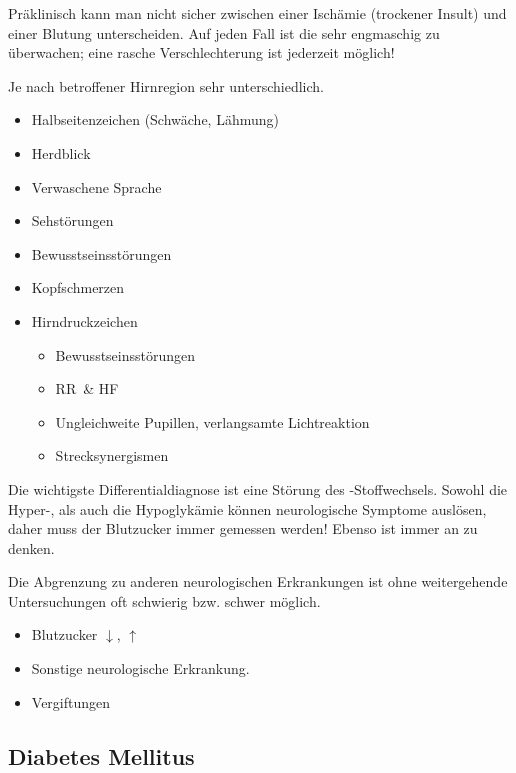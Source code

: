 {{\begin{itemize}
\end{itemize}

Präklinisch kann man nicht sicher zwischen einer Ischämie
(trockener Insult) und einer Blutung unterscheiden.
Auf jeden Fall ist die  sehr engmaschig
zu überwachen; eine rasche Verschlechterung ist jederzeit
möglich! 
}
{
Je nach betroffener Hirnregion sehr unterschiedlich.
\begin{itemize}
  \item Halbseitenzeichen (Schwäche, Lähmung)
  \item Herdblick
  \item Verwaschene Sprache
  \item Sehstörungen
  \item Bewusstseinsstörungen
  \item Kopfschmerzen
  \item Hirndruckzeichen
  \begin{itemize}
    \item Bewusstseinsstörungen
    \item RR\, \& HF\,
    \item Ungleichweite Pupillen, verlangsamte Lichtreaktion
    \item Strecksynergismen
  \end{itemize}
\end{itemize}
}{}{}{}


{
Die wichtigste Differentialdiagnose ist eine Störung des
-Stoffwechsels. Sowohl die Hyper-, als auch
die Hypoglykämie können neurologische Symptome auslösen, daher
muss der Blutzucker immer gemessen werden! Ebenso ist immer
an  zu denken.

Die Abgrenzung zu anderen neurologischen Erkrankungen ist
ohne weitergehende Untersuchungen oft schwierig bzw. schwer
möglich. 
}{
\begin{itemize}
  \item Blutzucker ${\downarrow}$, ${\uparrow}$
  \item Sonstige neurologische Erkrankung.
  \item Vergiftungen
\end{itemize}

}{}{}{}


\subsection{Diabetes Mellitus}
\label{topic:diabetes}
\label{topic:diabetes-mellitus}

}
